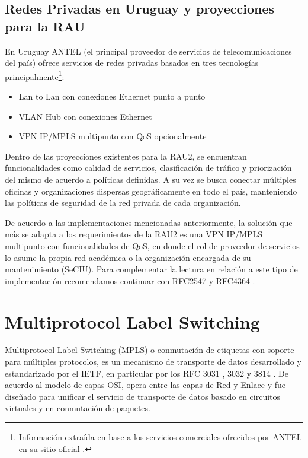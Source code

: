 \subsection{Redes Privadas en Uruguay y proyecciones para la RAU}
En Uruguay ANTEL (el principal proveedor de servicios de telecomunicaciones del país) ofrece servicios de redes privadas basados en tres tecnolog\'ias principalmente\footnote{Informaci\'on extra\'ida en base a los servicios comerciales ofrecidos por ANTEL en su sitio oficial \cite{ANTELVPN}.}: 

\begin{itemize}
\item Lan to Lan con conexiones Ethernet punto a punto
\item VLAN Hub con conexiones Ethernet 
\item VPN IP/MPLS multipunto con QoS opcionalmente
\end{itemize} 

Dentro de las proyecciones existentes para la RAU2, se encuentran funcionalidades como calidad de servicios, clasificaci\'on de tr\'afico y priorizaci\'on del mismo de acuerdo a pol\'iticas definidas. A su vez se busca conectar m\'ultiples oficinas y organizaciones dispersas geográficamente en todo el país, manteniendo las pol\'iticas de seguridad de la red privada de cada organizaci\'on. 

De acuerdo a las implementaciones mencionadas anteriormente, la soluci\'on que m\'as se adapta a los requerimientos de la RAU2 es una VPN IP/MPLS multipunto con funcionalidades de QoS, en donde el rol de proveedor de servicios lo asume la propia red académica o la organizaci\'on encargada de su mantenimiento (SeCIU). Para complementar la lectura en relaci\'on a este tipo de implementaci\'on recomendamos continuar con RFC2547 \citep{rosen1999bgp} y RFC4364 \citep{rosen2006bgp}.

\section{Multiprotocol Label Switching}
\label{section2.8}

Multiprotocol Label Switching (MPLS) o conmutación de etiquetas con soporte para múltiples protocolos, es un mecanismo de transporte de datos desarrollado y estandarizado por el IETF, en particular por los RFC 3031 \cite{rosen2001multiprotocol}, 3032 \citep{rosen2001mpls} y 3814 \citep{nadeau2004multiprotocol}. De acuerdo al modelo de capas OSI, opera entre las capas de Red y Enlace y fue diseñado para unificar el servicio de transporte de datos basado en circuitos virtuales y en conmutación de paquetes.

